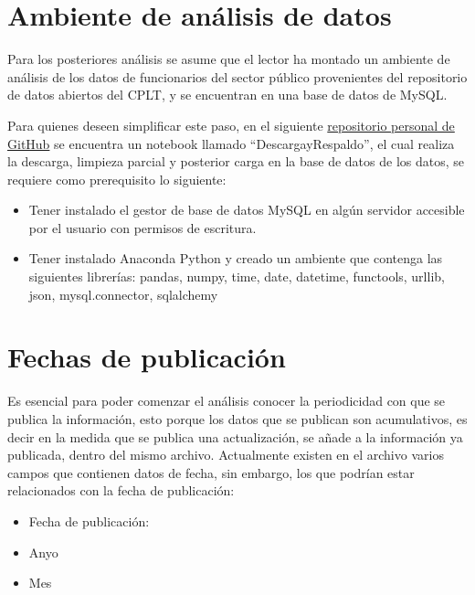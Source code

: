 \documentclass[11pt]{article}
\providecommand{\tightlist}{%
      \setlength{\itemsep}{0pt}\setlength{\parskip}{0pt}}
\begin{document}
    \hypertarget{ambiente-de-anuxe1lisis-de-datos}{%
\section{Ambiente de análisis de
datos}\label{ambiente-de-anuxe1lisis-de-datos}}

    Para los posteriores análisis se asume que el lector ha montado un
ambiente de análisis de los datos de funcionarios del sector público
provenientes del repositorio de datos abiertos del CPLT, y se encuentran
en una base de datos de MySQL.

Para quienes deseen simplificar este paso, en el siguiente
\href{https://www.repositorio.com/actualizaralterminar}{repositorio
personal de GitHub} se encuentra un notebook llamado
``DescargayRespaldo'', el cual realiza la descarga, limpieza parcial y
posterior carga en la base de datos de los datos, se requiere como
prerequisito lo siguiente:

\begin{itemize}
\tightlist
\item
  Tener instalado el gestor de base de datos MySQL en algún servidor
  accesible por el usuario con permisos de escritura.
\item
  Tener instalado Anaconda Python y creado un ambiente que contenga las
  siguientes librerías: pandas, numpy, time, date, datetime, functools,
  urllib, json, mysql.connector, sqlalchemy
\end{itemize}

    \hypertarget{fechas-de-publicaciuxf3n}{%
\section{Fechas de publicación}\label{fechas-de-publicaciuxf3n}}

    Es esencial para poder comenzar el análisis conocer la periodicidad con
que se publica la información, esto porque los datos que se publican son
acumulativos, es decir en la medida que se publica una actualización, se
añade a la información ya publicada, dentro del mismo archivo.
Actualmente existen en el archivo varios campos que contienen datos de
fecha, sin embargo, los que podrían estar relacionados con la fecha de
publicación:

\begin{itemize}
\tightlist
\item
  Fecha de publicación:
\item
  Anyo
\item
  Mes
\end{itemize}
\end{document}
